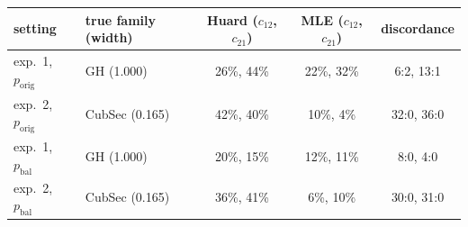 \begin{tabular}{llccc}
\toprule
setting & true family (width) & Huard ($c_{12}$, $c_{21}$) & MLE ($c_{12}$, $c_{21}$) & discordance \\
\midrule
exp.~1, $p_{\text{orig}}$ & GH (1.000) & 26\%, 44\% & 22\%, 32\% & 6:2, 13:1 \\
exp.~2, $p_{\text{orig}}$ & CubSec (0.165) & 42\%, 40\% & 10\%, 4\% & 32:0, 36:0 \\
exp.~1, $p_{\text{bal}}$ & GH (1.000) & 20\%, 15\% & 12\%, 11\% & 8:0, 4:0 \\
exp.~2, $p_{\text{bal}}$ & CubSec (0.165) & 36\%, 41\% & 6\%, 10\% & 30:0, 31:0 \\
\bottomrule
\end{tabular}
